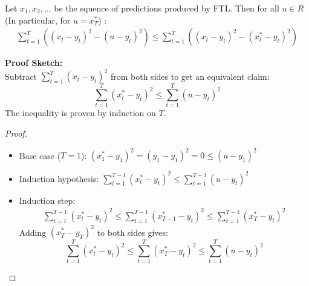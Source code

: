 \documentclass[handout]{beamer}
\begin{document}
\begin{frame}
  \begin{lemma}
    Let $x_1, x_2,\ldots$ be the squence of predictions produced by FTL. Then for all $u \in R$ (In particular, for $u=x^*_T$) :
    \begin{eqnarray*}
	\sum_{t=1}^T \left( (x_t-y_t)^2 - (u - y_t)^2\right) \leq  \sum_{t=1}^T \left( (x_t-y_t)^2 - (x^*_t- y_t)^2\right)
    \end{eqnarray*}
  \end{lemma}
  {\bf Proof Sketch:}\\
  Subtract $\sum_{t=1}^T (x_t-y_t)^2$ from both sides to get an equivalent claim:
  \[
    \sum_{t=1}^T (x^*_t- y_t)^2 \leq \sum_{t=1}^T (u - y_t)^2
  \]
The inequality is proven by induction on $T$.
\end{frame}

\begin{frame}
\begin{proof}
\begin{itemize}
\item Base case ($T=1$): $(x^*_1 - y_1)^2 = (y_1 - y_1)^2 = 0 \le (u-y_1)^2$
\item Induction hypothesis: $\sum_{t=1}^{T-1}(x^*_t - y_t)^2 \leq \sum_{t=1}^{T-1} (u - y_t)^2$
\item Induction step:
    \begin{eqnarray*}
    	\sum_{t=1}^{T-1}(x^*_t - y_t)^2 \leq \sum_{t=1}^{T-1}(x^*_{T-1} - y_t)^2 \leq \sum_{t=1}^{T-1}(x^*_{T} - y_t)^2
    \end{eqnarray*}
    Adding $(x^*_T - y_T)^2$ to both sides gives: $$\sum_{t=1}^{T}(x^*_t - y_t)^2 \leq \sum_{t=1}^{T} (x^*_{T} - y_t)^2  \leq \sum_{t=1}^{T} (u - y_t)^2$$
\end{itemize}
\end{proof}
\end{frame}

%
\end{document}
